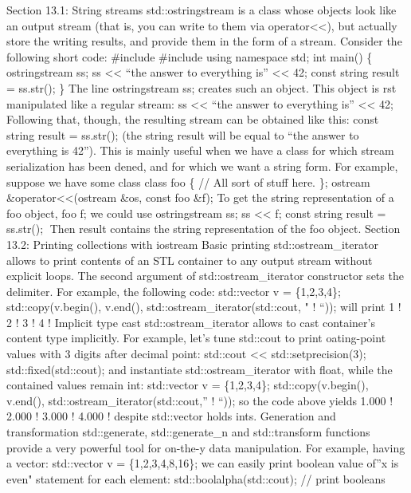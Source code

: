Section 13.1: String streams std::ostringstream is a class whose objects
look like an output stream (that is, you can write to them via
operator\textless\textless), but actually store the writing results, and
provide them in the form of a stream. Consider the following short code:
\#include \#include using namespace std; int main() \{ ostringstream ss;
ss \textless\textless{} ``the answer to everything is''
\textless\textless{} 42; const string result = ss.str(); \} The line
ostringstream ss; creates such an object. This object is rst manipulated
like a regular stream: ss \textless\textless{} ``the answer to
everything is'' \textless\textless{} 42; Following that, though, the
resulting stream can be obtained like this: const string result =
ss.str(); (the string result will be equal to ``the answer to everything
is 42''). This is mainly useful when we have a class for which stream
serialization has been dened, and for which we want a string form. For
example, suppose we have some class class foo \{ // All sort of stuff
here. \}; ostream \&operator\textless\textless(ostream \&os, const foo
\&f); To get the string representation of a foo object, foo f; we could
use ostringstream ss; ss \textless\textless{} f; const string result =
ss.str(); Then result contains the string representation of the foo
object. Section 13.2: Printing collections with iostream Basic printing
std::ostream\_iterator allows to print contents of an STL container to
any output stream without explicit loops. The second argument of
std::ostream\_iterator constructor sets the delimiter. For example, the
following code: std::vector v = \{1,2,3,4\}; std::copy(v.begin(),
v.end(), std::ostream\_iterator(std::cout, " ! ``)); will print 1 ! 2 !
3 ! 4 ! Implicit type cast std::ostream\_iterator allows to cast
container's content type implicitly. For example, let's tune std::cout
to print oating-point values with 3 digits after decimal point:
std::cout \textless\textless{} std::setprecision(3);
std::fixed(std::cout); and instantiate std::ostream\_iterator with
float, while the contained values remain int: std::vector v =
\{1,2,3,4\}; std::copy(v.begin(), v.end(),
std::ostream\_iterator(std::cout,'' ! ``)); so the code above yields
1.000 ! 2.000 ! 3.000 ! 4.000 ! despite std::vector holds ints.
Generation and transformation std::generate, std::generate\_n and
std::transform functions provide a very powerful tool for on-the-y data
manipulation. For example, having a vector: std::vector v =
\{1,2,3,4,8,16\}; we can easily print boolean value of''x is even"
statement for each element: std::boolalpha(std::cout); // print booleans
